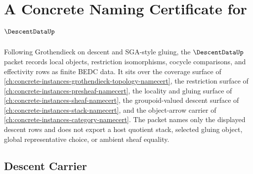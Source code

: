 \chapter{A Concrete Naming Certificate for $\DescentDataUp$}
\label{ch:concrete-instances-descent-data-namecert}

Following Grothendieck on descent and SGA-style gluing, the $\DescentDataUp$ packet records local objects, restriction isomorphisms, cocycle comparisons, and effectivity rows as finite BEDC data. It sits over the coverage surface of \autoref{ch:concrete-instances-grothendieck-topology-namecert}, the restriction surface of \autoref{ch:concrete-instances-presheaf-namecert}, the locality and gluing surface of \autoref{ch:concrete-instances-sheaf-namecert}, the groupoid-valued descent surface of \autoref{ch:concrete-instances-stack-namecert}, and the object-arrow carrier of \autoref{ch:concrete-instances-category-namecert}. The packet names only the displayed descent rows and does not export a host quotient stack, selected gluing object, global representative choice, or ambient sheaf equality.

\section{Descent Carrier}
\label{sec:descent-data-carrier}

